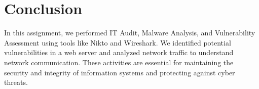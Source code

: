 \documentclass[11pt]{article}
\begin{document}
\section{Conclusion}

In this assignment, we performed IT Audit, Malware Analysis, and Vulnerability Assessment using tools like Nikto and Wireshark. We identified potential vulnerabilities in a web server and analyzed network traffic to understand network communication. These activities are essential for maintaining the security and integrity of information systems and protecting against cyber threats.
\clearpage

\pagebreak
\end{document}
